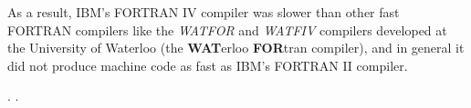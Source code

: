As a result, IBM's FORTRAN IV compiler was slower than other fast FORTRAN compilers
like the \textit{WATFOR} and \textit{WATFIV} compilers developed at the University of Waterloo
(the \textbf{WAT}erloo \textbf{FOR}tran compiler\cite{cress_dirksen_graham_watfor_fortran_iv_1970}),
and in general it did not produce machine code as fast as IBM's FORTRAN II compiler.


.
\cite{backus_heising_fortran_1964}.

